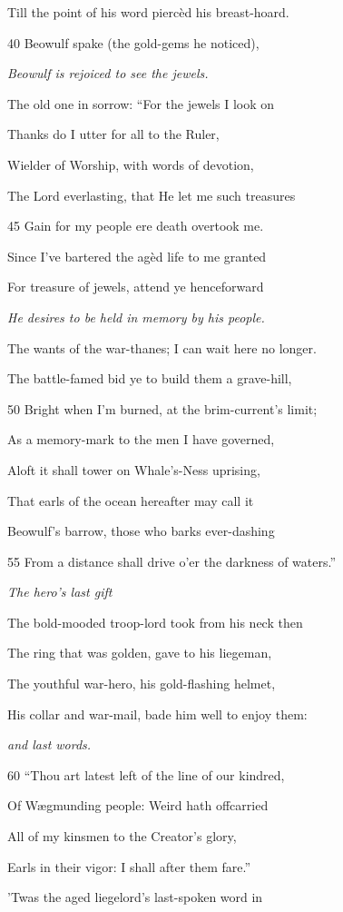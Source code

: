 Till the point of his word piercèd his breast-hoard.

40
Beowulf spake (the gold-gems he noticed),

\emph{Beowulf is rejoiced
to see the jewels.}

The old one in sorrow: “For the jewels I look on

Thanks do I utter for all to the Ruler,

Wielder of Worship, with words of devotion,

The Lord everlasting, that He let me such treasures

45
Gain for my people ere death overtook me.

Since I’ve bartered the agèd life to me granted

For treasure of jewels, attend ye henceforward

\emph{He desires to be
held in memory by
his people.}

The wants of the war-thanes; I can wait here no longer.

The battle-famed bid ye to build them a grave-hill,

50
Bright when I’m burned, at the brim-current’s limit;

As a memory-mark to the men I have governed,

Aloft it shall tower on Whale’s-Ness uprising,

That earls of the ocean hereafter may call it

Beowulf’s barrow, those who barks ever-dashing

55
From a distance shall drive o’er the darkness of waters.”

\emph{The hero’s last
gift}

The bold-mooded troop-lord took from his neck then

The ring that was golden, gave to his liegeman,

The youthful war-hero, his gold-flashing helmet,

His collar and war-mail, bade him well to enjoy them:

\emph{and last words.}

60
“Thou art latest left of the line of our kindred,

Of Wægmunding people: Weird hath offcarried

All of my kinsmen to the Creator’s glory,

Earls in their vigor: I shall after them fare.”

’Twas the aged liegelord’s last-spoken word in

